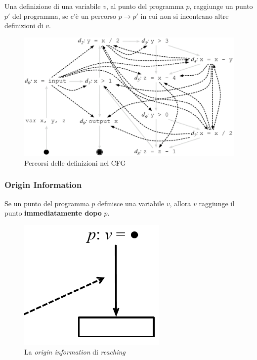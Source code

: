 \begin{definition}
Una definizione di una variabile $v$, al punto del programma $p$, raggiunge un
punto $p'$ del programma, se c'\`e un percorso $p \to p'$ in cui non si
incontrano altre definizioni di $v$.
\end{definition}

\begin{figure}[H]
  \centering
  \includegraphics[scale=0.4]{res/image/show_path_use}
  \caption{Percorsi delle definizioni nel CFG}
  \label{img:show_path_use}
\end{figure}

\subsubsection{Origin Information}
Se un punto del programma $p$ definisce una variabile $v$, allora $v$ raggiunge
il punto \textbf{immediatamente dopo} $p$.

\begin{figure}[H]
  \centering
  \includegraphics[scale=0.4]{res/image/origin_reaching}
  \caption{La \textit{origin information} di \textit{reaching}}
  \label{img:origin_reaching}
\end{figure}

